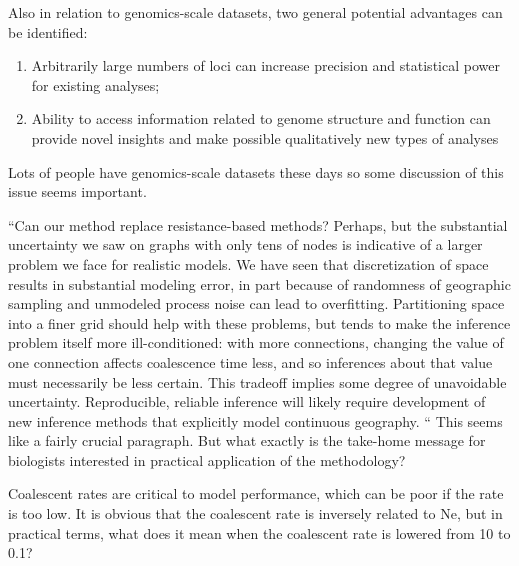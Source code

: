 \reply{
}

\begin{point}{}
    Also in relation to genomics-scale datasets, two general potential
    advantages can be identified:
    \begin{enumerate}
        \item       Arbitrarily large numbers of loci can increase precision
            and statistical power for existing analyses;
        \item       Ability to access information related to genome structure
            and function can provide novel insights and make possible
            qualitatively new types of analyses
    \end{enumerate}
    Lots of people have genomics-scale datasets these days so some discussion of
    this issue seems important.
\end{point}

\reply{
}

\begin{point}{}
    ``Can our method replace resistance-based methods? Perhaps, but the substantial
    uncertainty we saw on graphs with only tens of nodes is indicative of a
    larger problem we face for realistic models. We have seen that
    discretization of space results in substantial modeling error, in part
    because of randomness of geographic sampling and unmodeled process noise
    can lead to overfitting. Partitioning space into a finer grid should help
    with these problems, but tends to make the inference problem itself more
    ill-conditioned: with more connections, changing the value of one
    connection affects coalescence time less, and so inferences about that
    value must necessarily be less certain. This tradeoff implies some degree
    of unavoidable uncertainty.  Reproducible, reliable inference will likely
    require development of new inference methods that explicitly model
    continuous geography. `` This seems like a fairly crucial paragraph.  But
    what exactly is the take-home message for biologists interested in
    practical application of the methodology?
\end{point}

\reply{
}

\begin{point}{}
    Coalescent rates are critical to model performance, which can be poor if the
    rate is too low.  It is obvious that the coalescent rate is inversely
    related to Ne, but in practical terms, what does it mean when the
    coalescent rate is lowered from 10 to 0.1?
\end{point}

